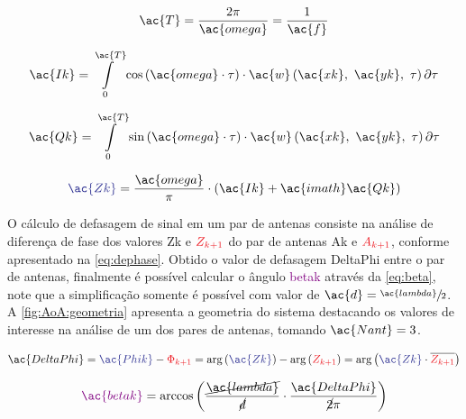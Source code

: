 \begin{equation} \label{eq:periodo}
    \ac{T} = \frac{2\pi}{\ac{omega}} = \frac{1}{\ac{f}}
\end{equation}

\begin{equation} \label{eq:in_phase}
    \ac{Ik} =
    \int\limits_0^{\ac{T}} \cos\left(\ac{omega} \cdot\tau\right)
    \cdot \ac{w}\left( \ac{xk}, ~\ac{yk}, ~\tau \right) \partial \tau
\end{equation}

\begin{equation} \label{eq:out_of_phase}
    \ac{Qk} =
    \int\limits_0^{\ac{T}} \sin\left(\ac{omega}\cdot\tau\right)
    \cdot \ac{w}\left( \ac{xk}, ~\ac{yk}, ~\tau \right) \partial \tau
\end{equation}

\begin{equation} \label{eq:Z}
    \textcolor{cmyk_B}{\ac{Zk}} =
    \frac{\ac{omega}}{\pi}\cdot\left(\ac{Ik} + \ac{imath} \ac{Qk}\right)
\end{equation}


O cálculo de defasagem de sinal em um par de antenas consiste na análise de diferença de fase dos valores \textcolor{cmyk_B}{\ac{Zk}} e $\textcolor{cmyk_R}{Z_{k+1}}$ do par de antenas \textcolor{cmyk_B}{\ac{Ak}} e $\textcolor{cmyk_R}{A_{k+1}}$, conforme apresentado na \autoref{eq:dephase}.
Obtido o valor de defasagem \ac{DeltaPhi} entre o par de antenas, finalmente é possível calcular o ângulo \textcolor{Purple}{\ac{betak}} através da \autoref{eq:beta}, note que a simplificação somente é possível com valor de $\ac{d} = \sfrac{\ac{lambda}}{2}$.
A \autoref{fig:AoA:geometria} apresenta a geometria do sistema destacando os valores de interesse na análise de um dos pares de antenas, tomando $\ac{Nant} = 3$.

\begin{equation} \label{eq:dephase}
    \ac{DeltaPhi} =
    \textcolor{cmyk_B}{\ac{Phik}} - \textcolor{cmyk_R}{\Phi_{k+1}} =
    \arg\left(\textcolor{cmyk_B}{\ac{Zk}}\right) - \arg\left(\textcolor{cmyk_R}{Z_{k+1}}\right) =
    \arg\left(\textcolor{cmyk_B}{\ac{Zk}} \cdot \overline{\textcolor{cmyk_R}{Z_{k+1}}}\right)
\end{equation}

\begin{equation} \label{eq:beta}
    \textcolor{Purple}{\ac{betak}} = \arccos\left(\frac{\cancel{\ac{lambda}}}{\cancel{d}}\cdot\frac{\ac{DeltaPhi}}{\cancel{2}\pi}\right)
\end{equation}

